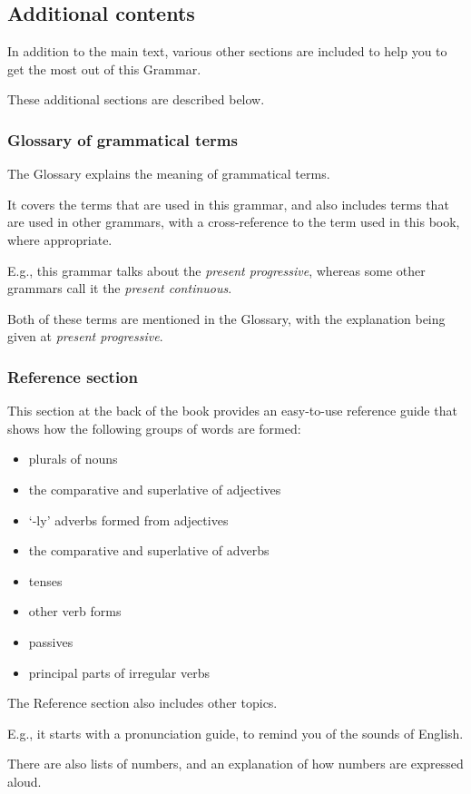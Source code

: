 \documentclass[oneside]{book}
\numberwithin{equation}{section}
\begin{document}
\subsection{Additional contents}
In addition to the main text, various other sections are included to help you to get the most out of this Grammar.

These additional sections are described below.

\subsubsection{Glossary of grammatical terms}
The Glossary explains the meaning of grammatical terms.

It covers the terms that are used in this grammar, and also includes terms that are used in other grammars, with a cross-reference to the term used in this book, where appropriate.

E.g., this grammar talks about the \textit{present progressive}, whereas some other grammars call it the \textit{present continuous}.

Both of these terms are mentioned in the Glossary, with the explanation being given at \textit{present progressive}.

\subsubsection{Reference section}
This section at the back of the book provides an easy-to-use reference guide that shows how the following groups of words are formed:
\begin{itemize}
    \item plurals of nouns
    \item the comparative and superlative of adjectives
    \item `-ly' adverbs formed from adjectives
    \item the comparative and superlative of adverbs
    \item tenses
    \item other verb forms
    \item passives
    \item principal parts of irregular verbs
\end{itemize}
The Reference section also includes other topics.

E.g., it starts with a pronunciation guide, to remind you of the sounds of English.

There are also lists of numbers, and an explanation of how numbers are expressed aloud.
\end{document}
